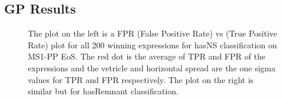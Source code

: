 \subsection{GP Results}



\begin{figure}[htp]
  \centering
  \quad
  \caption{The plot on the left is a FPR (False Positive Rate) vs (True Positive Rate) plot for all 200 winning expressions for hasNS classification on MS1-PP EoS. The red dot is the average of TPR and FPR of the expressions and the vetricle and horizontal spread are the one sigma values for TPR and FPR respectively. The plot on the right is similar but for hasRemnant classification.  }
  \label{fig:FPR_TPR}
\end{figure}

